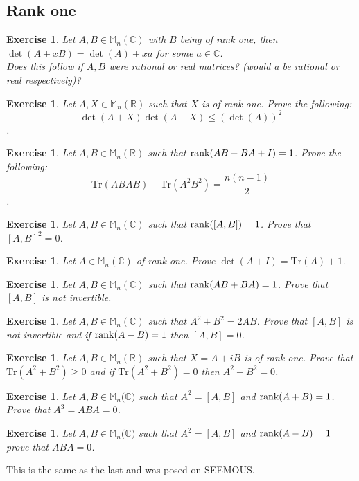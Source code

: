 \documentclass[12pt]{article}
\theoremstyle{definition}
\theoremstyle{remark}
\theoremstyle{plain}
\newtheorem{ex}[subsubsection]{Exercise}
\begin{document}
\subsection*{Rank one}
\begin{ex}
   Let $A,B\in \mathbb{M}_n(\mathbb{C})$ with $B$ being of rank one, then $\det(A+xB)=\det(A)+xa$ for some $a\in \mathbb{C}$.\\
   Does this follow if $A,B$ were rational or real matrices? (would a be rational or real respectively)?
\end{ex}
\begin{ex}
    Let $A,X\in \mathbb{M}_n(\mathbb{R})$ such that $X$ is of rank one. Prove the following:$$\det(A+X)\det(A-X)\leq(\det(A))^2$$.
\end{ex}
\begin{ex}
    Let $A,B\in \mathbb{M}_n(\mathbb{R})$ such that $\rank(AB-BA+I)=1$. Prove the following:$$\mathrm{Tr}(ABAB)-\mathrm{Tr}(A^2B^2)=\frac{n(n-1)}{2}$$.
\end{ex}
\begin{ex}
    Let $A,B\in \mathbb{M}_n(\mathbb{C})$ such that $\rank([A,B])=1$. Prove that $[A,B]^2=0$.
\end{ex}
\begin{ex}
    Let $A\in \mathbb{M}_n(\mathbb{C})$ of rank one. Prove $\det(A+I)=\mathrm{Tr}(A)+1$.
\end{ex}
\begin{ex}
    Let $A,B\in \mathbb{M}_n(\mathbb{C})$ such that $\rank(AB+BA)=1$. Prove that $[A,B]$ is not invertible.
\end{ex}
\begin{ex}
    Let $A,B\in \mathbb{M}_n(\mathbb{C})$ such that $A^2+B^2=2AB$. Prove that $[A,B]$ is not invertible and if $\rank(A-B)=1$ then $[A,B]=0$.
\end{ex}
\begin{ex}
    Let $A,B\in \mathbb{M}_n(\mathbb{R})$ such that $X=A+iB$ is of rank one. Prove that $\mathrm{Tr}(A^2+B^2)\geq 0$ and if $\mathrm{Tr}(A^2+B^2)=  0$ then $A^2+B^2=0$.
\end{ex}


\begin{ex}
    Let $A,B\in \mathbb{M}_n(\mathbb{C)}$ such that $A^2=[A,B]$ and $\rank(A+B)=1$. Prove that $A^3=ABA=0$.
\end{ex}
\begin{ex}
    Let $A,B\in \mathbb{M}_n(\mathbb{C)}$ such that $A^2=[A,B]$ and $\rank(A-B)=1$ prove that $ABA=0$.
\end{ex}
This is the same as the last and was posed on SEEMOUS.
\end{document}

